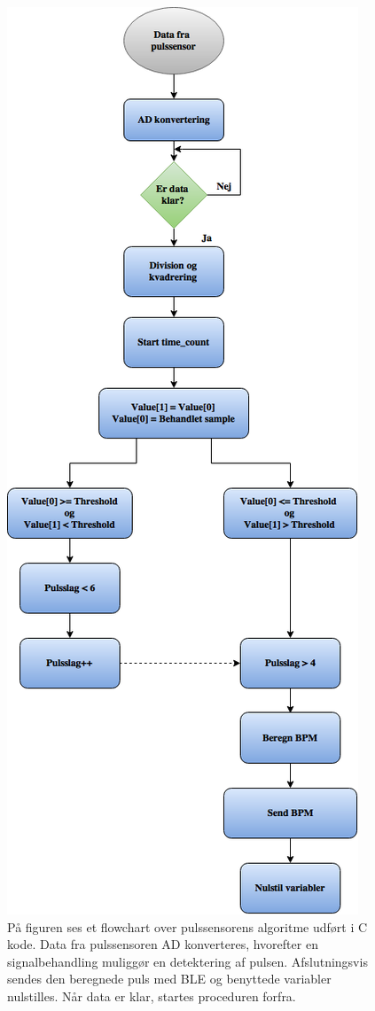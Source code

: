 \begin{figure}[H]
	\centering
	\includegraphics[scale=0.5]{figures/cDesign/Puls_ckode.png}
	\caption{På figuren ses et flowchart over pulssensorens algoritme udført i C kode. Data fra pulssensoren AD konverteres, hvorefter en signalbehandling muliggør en detektering af pulsen. Afslutningsvis sendes den beregnede puls med BLE og benyttede variabler nulstilles. Når data er klar, startes proceduren forfra.}
	\label{fig:puls_pseudo_c}
\end{figure} \vspace{-0.5cm}
